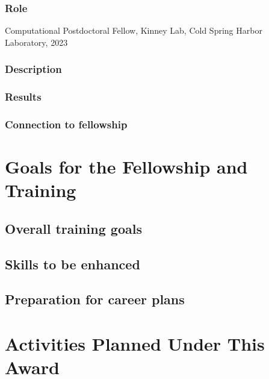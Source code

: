 \documentclass[11pt]{article}
\begin{document}
\subsubsection{Role}
Computational Postdoctoral Fellow, Kinney Lab, Cold Spring Harbor Laboratory, 2023
%
\subsubsection{Description}
%
\subsubsection{Results}
%
\subsubsection{Connection to fellowship}
%
\section*{Goals for the Fellowship and Training}
%
\subsection{Overall training goals}
%
\subsection{Skills to be enhanced}
%
\subsection{Preparation for career plans}
%
\section*{Activities Planned Under This Award}
\end{document}
